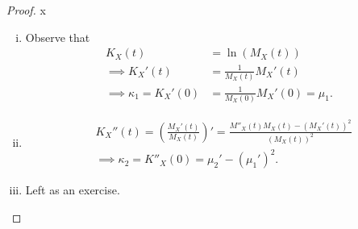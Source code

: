 \begin{proof}
		\phantom x
\begin{enumerate}[i.]
    \item Observe that
    \begin{align*}
		K_X(t)&=\ln(M_X(t)) \\
			\implies K_X'(t)&=\frac{1}{M_X(t)}M_X'(t) \\
			\implies \kappa_1=K_X'(0)&=\frac{1}{M_X(0)}M_X'(0)=\mu_1.
    \end{align*}
    \item 
    \begin{align*}
        &K_X''(t)=\left(\frac{M_X'(t)}{M_X(t)}\right)' = \frac{M''_X(t)M_X(t)-(M_X'(t))^2}{(M_X(t))^2}\\
        &\implies \kappa_2=K''_X(0)=\mu_2'-(\mu_1')^2.
    \end{align*}
    \item Left as an exercise.
\end{enumerate}
\end{proof}
